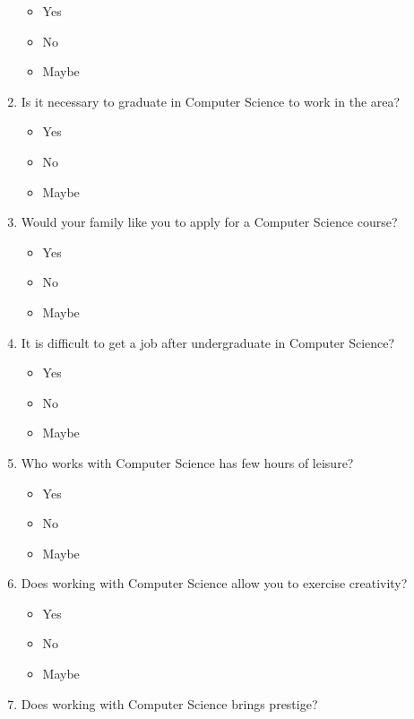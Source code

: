 \begin{enumerate}
\begin{itemize}
            \item Yes
            \item No
            \item Maybe
        \end{itemize}                            
    \item Is it necessary to graduate in Computer Science to work in the area?
        \begin{itemize}
            \item Yes
            \item No
            \item Maybe
        \end{itemize}        
    \item Would your family like you to apply for a Computer Science course?
        \begin{itemize}
            \item Yes
            \item No
            \item Maybe
        \end{itemize}                
    \item It is difficult to get a job after undergraduate in Computer Science?
        \begin{itemize}
            \item Yes
            \item No
            \item Maybe
        \end{itemize}        
    \item Who works with Computer Science has few hours of leisure?
        \begin{itemize}
            \item Yes
            \item No
            \item Maybe
        \end{itemize}    
    \item Does working with Computer Science allow you to exercise creativity?
        \begin{itemize}
            \item Yes
            \item No
            \item Maybe
        \end{itemize}
    \item Does working with Computer Science brings prestige?
        \begin{itemize}

\end{itemize}
\end{enumerate}
